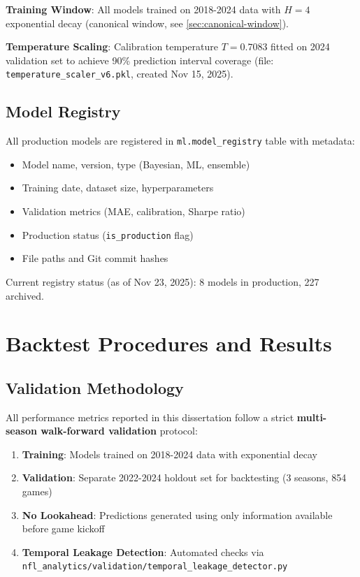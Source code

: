 \textbf{Training Window}: All models trained on 2018-2024 data with $H=4$ exponential decay (canonical window, see \autoref{sec:canonical-window}).

\textbf{Temperature Scaling}: Calibration temperature $T=0.7083$ fitted on 2024 validation set to achieve 90\% prediction interval coverage (file: \texttt{temperature\_scaler\_v6.pkl}, created Nov 15, 2025).

\subsection{Model Registry}

All production models are registered in \texttt{ml.model\_registry} table with metadata:
\begin{itemize}
    \item Model name, version, type (Bayesian, ML, ensemble)
    \item Training date, dataset size, hyperparameters
    \item Validation metrics (MAE, calibration, Sharpe ratio)
    \item Production status (\texttt{is\_production} flag)
    \item File paths and Git commit hashes
\end{itemize}

Current registry status (as of Nov 23, 2025): 8 models in production, 227 archived.

\section{Backtest Procedures and Results}

\subsection{Validation Methodology}

All performance metrics reported in this dissertation follow a strict \textbf{multi-season walk-forward validation} protocol:

\begin{enumerate}
    \item \textbf{Training}: Models trained on 2018-2024 data with exponential decay
    \item \textbf{Validation}: Separate 2022-2024 holdout set for backtesting (3 seasons, 854 games)
    \item \textbf{No Lookahead}: Predictions generated using only information available before game kickoff
    \item \textbf{Temporal Leakage Detection}: Automated checks via \texttt{nfl\_analytics/validation/temporal\_leakage\_detector.py}
\end{enumerate}

